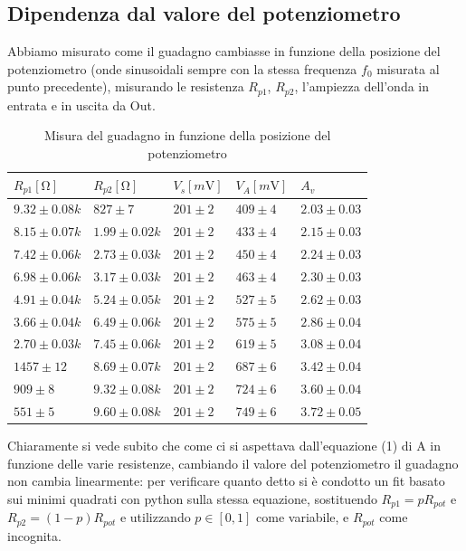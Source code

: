 \documentclass[10pt, a4paper, italian]{article}
\begin{document}
\subsection{Dipendenza dal valore del potenziometro}
Abbiamo misurato come il guadagno cambiasse in funzione della posizione del potenziometro (onde sinusoidali sempre con la stessa frequenza $f_0$ misurata al punto precedente), misurando le resistenza $R_{p1}$, $R_{p2}$, l'ampiezza dell'onda in entrata e in uscita da Out.
\begin{table}[H]
\centering
\begin{tabular}{@{}lllll@{}}
\toprule
$R_{p1} [\si{\ohm}]$  & $R_{p2} [\si{\ohm}]$ & $V_{s} [\si{m\V}]$ & $V_{A} [\si{m\V}]$ & $A_v$ \\
\midrule
$9.32 \pm 0.08 k$ &	$827 \pm 7$	& $201 \pm 2$ 	& $ 409 \pm 4$	& $2.03 \pm 0.03$\\
$8.15 \pm 0.07 k$ &	$1.99 \pm 0.02 k$	& $201 \pm 2$ 	& $ 433 \pm 4$	&$2.15 \pm 0.03$\\
$7.42 \pm 0.06 k$ &	$2.73 \pm 0.03 k$	& $201 \pm 2$ 	&$ 450 \pm 4$	&$2.24 \pm 0.03$\\
$6.98 \pm 0.06 k$ &	$3.17 \pm 0.03 k$	& $201 \pm 2$ 	&	$ 463 \pm 4$&$2.30 \pm 0.03$\\
$4.91 \pm 0.04 k$ &	$5.24 \pm 0.05 k$	& $201 \pm 2$ 	&	$ 527 \pm 5$&$2.62 \pm 0.03$\\
$3.66 \pm 0.04 k$ &	$6.49 \pm 0.06 k$	& $201 \pm 2$ 	&$ 575 \pm 5$	&$2.86 \pm 0.04$\\
$2.70 \pm 0.03 k$ &	$7.45 \pm 0.06 k$	& $201 \pm 2$ 	&$ 619 \pm 5$	&$3.08 \pm 0.04$\\
$1457 \pm 12 $ &	$8.69 \pm 0.07 k$	& $201 \pm 2$ 	&	$ 687 \pm 6$&$3.42 \pm 0.04$\\
$909 \pm 8 $ &	$9.32 \pm 0.08 k$	& $201 \pm 2$ 	&$ 724 \pm 6$	&$3.60 \pm 0.04$\\
$551 \pm 5 $ &	$9.60 \pm 0.08 k$	& $201 \pm 2$ 	&	$ 749 \pm 6$&$3.72 \pm 0.05$\\

\bottomrule
\end{tabular}
\caption{Misura del guadagno in funzione della posizione del potenziometro}
\end{table}
Chiaramente si vede subito che come ci si aspettava dall'equazione (1) di A in funzione delle varie resistenze, cambiando il valore del potenziometro il guadagno non cambia linearmente: per verificare quanto detto si è condotto un fit basato sui minimi quadrati con python sulla stessa equazione, sostituendo $R_{p1} = p R_{pot}$ e $R_{p2}=(1-p)R_{pot}$ e utilizzando $p \in [0,1]$ come variabile, e $R_{pot}$ come incognita.
\end{document}
